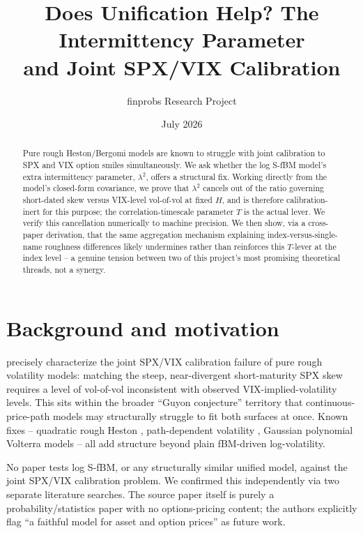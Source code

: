 \documentclass[11pt]{article}
\title{Does Unification Help? The Intermittency Parameter\\ and Joint SPX/VIX Calibration}
\author{finprobs Research Project}
\date{July 2026}
\begin{document}
\maketitle

\begin{abstract}
Pure rough Heston/Bergomi models are known to struggle with joint calibration to SPX and VIX option smiles simultaneously. We ask whether the log S-fBM model's extra intermittency parameter, $\lambda^2$, offers a structural fix. Working directly from the model's closed-form covariance, we prove that $\lambda^2$ cancels out of the ratio governing short-dated skew versus VIX-level vol-of-vol at fixed $H$, and is therefore calibration-inert for this purpose; the correlation-timescale parameter $T$ is the actual lever. We verify this cancellation numerically to machine precision. We then show, via a cross-paper derivation, that the same aggregation mechanism explaining index-versus-single-name roughness differences likely undermines rather than reinforces this $T$-lever at the index level -- a genuine tension between two of this project's most promising theoretical threads, not a synergy.
\end{abstract}

\section{Background and motivation}

\citet{gatheral2020quadratic} precisely characterize the joint SPX/VIX calibration failure of pure rough volatility models: matching the steep, near-divergent short-maturity SPX skew requires a level of vol-of-vol inconsistent with observed VIX-implied-volatility levels. This sits within the broader ``Guyon conjecture'' territory \citep{guyon2022vix} that continuous-price-path models may structurally struggle to fit both surfaces at once. Known fixes -- quadratic rough Heston \citep{gatheral2020quadratic}, path-dependent volatility \citep{guyonlekeufack2023pdv,gazzaniguyon2025fourfactor}, Gaussian polynomial Volterra models \citep{abijaber2025gaussian} -- all add structure beyond plain fBM-driven log-volatility.

\begin{finding}
No paper tests log S-fBM, or any structurally similar unified model, against the joint SPX/VIX calibration problem. We confirmed this independently via two separate literature searches. The source paper itself \citep{wu2022rough} is purely a probability/statistics paper with no options-pricing content; the authors explicitly flag ``a faithful model for asset and option prices'' as future work.
\end{finding}
\end{document}
